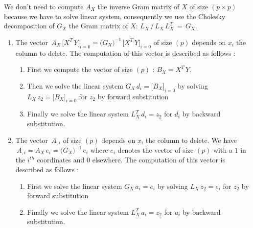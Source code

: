 We don't need to compute $A_X$ the inverse Gram matrix of $X$ of size $(p\times p)$ because we have to solve linear system, consequently   
we use the Cholesky decomposition of $G_X$ the Gram matrix of $X$: $L_X  \,/\, L_X\,L_X^T\,=\,G_X$.
\begin{enumerate}
\item The vector $\,A_X\,\big[X^T\,Y\big]_{i=0}=\big(G_X\big)^{-1}\,\big[X^T\,Y\big]_{i=0}$ of size $(p)$ depends on $x_i$ the column to delete.  
The computation of this vector is described as follows : 
\begin{enumerate}
\item First we compute the vector of size $(p)$ : $B_X=X^T\,Y$.
\item Then we solve the linear system $G_X \,d_i= \big[B_X\big]_{i=0}$ by solving $L_X\,z_2= \big[B_X\big]_{i=0}$ for $z_2$ by forward substitution
\item Finally we solve the linear system $L_X^T\,d_i=z_2$ for $d_i$ by backward substitution.
\end{enumerate}
\item The vector $\,A_{,i}$ of size $(p)$ depends on $x_i$ the column to delete.  
We have $\,A_{,i}=A_X \, e_i=\big(G_X\big)^{-1}\,e_i$  where $e_i$ denotes the vector of size $(p)$ with a $1$ in the $i^{th}$ coordinates and $0$ elsewhere.
The computation of this vector is described as follows : 
\begin{enumerate}
\item First we solve the linear system $G_X \,a_i= e_i$ by solving $L_X\,z_2= e_i$ for $z_2$ by forward substitution
\item Finally we solve the linear system $L_X^T\,a_i=z_2$ for $a_i$ by backward substitution.
\end{enumerate}
\end{enumerate}


\newpage
